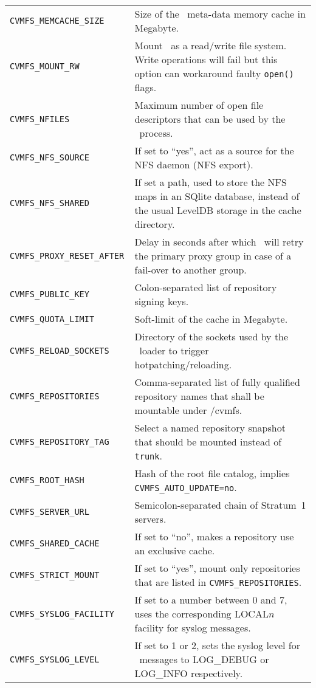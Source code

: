 \begin{longtable}{lX}
		\tt CVMFS\_MEMCACHE\_SIZE			& Size of the \cvmfs\ meta-data memory cache in Megabyte.\\
		\tt CVMFS\_MOUNT\_RW				& Mount \cvmfs\ as a read/write file system.  Write operations will fail but this option can workaround faulty \texttt{open()} flags.\\
		\tt CVMFS\_NFILES					& Maximum number of open file descriptors that can be used by the \cvmfs\ process.\\
		\tt CVMFS\_NFS\_SOURCE				& If set to ``yes'', act as a source for the NFS daemon (NFS export).\\
		\tt CVMFS\_NFS\_SHARED				& If set a path, used to store the NFS maps in an SQlite database, instead of the usual LevelDB storage in the cache directory.\\
		\tt CVMFS\_PROXY\_RESET\_AFTER		& Delay in seconds after which \cvmfs\ will retry the primary proxy group in case of a fail-over to another group.\\
		\tt CVMFS\_PUBLIC\_KEY				& Colon-separated list of repository signing keys.\\
		\tt CVMFS\_QUOTA\_LIMIT			& Soft-limit of the cache in Megabyte.\\
		\tt CVMFS\_RELOAD\_SOCKETS			& Directory of the sockets used by the \cvmfs\ loader to trigger hotpatching/reloading.\\
		\tt CVMFS\_REPOSITORIES			& Comma-separated list of fully qualified repository names that shall be mountable under /cvmfs.\\
		\tt CVMFS\_REPOSITORY\_TAG			& Select a named repository snapshot that should be mounted instead of \texttt{trunk}.\\
		\tt CVMFS\_ROOT\_HASH				& Hash of the root file catalog, implies \texttt{CVMFS\_AUTO\_UPDATE=no}.\\
		\tt CVMFS\_SERVER\_URL				& Semicolon-separated chain of Stratum~1 servers.\\
		\tt CVMFS\_SHARED\_CACHE			& If set to ``no'', makes a repository use an exclusive cache.\\
		\tt CVMFS\_STRICT\_MOUNT			& If set to ``yes'', mount only repositories that are listed in \texttt{CVMFS\_REPOSITORIES}.\\
		\tt CVMFS\_SYSLOG\_FACILITY		& If set to a number between 0 and 7, uses the corresponding LOCAL$n$ facility for syslog messages.\\
		\tt CVMFS\_SYSLOG\_LEVEL			& If set to 1 or 2, sets the syslog level for \cvmfs\ messages to LOG\_DEBUG or LOG\_INFO respectively.\\

\end{longtable}
